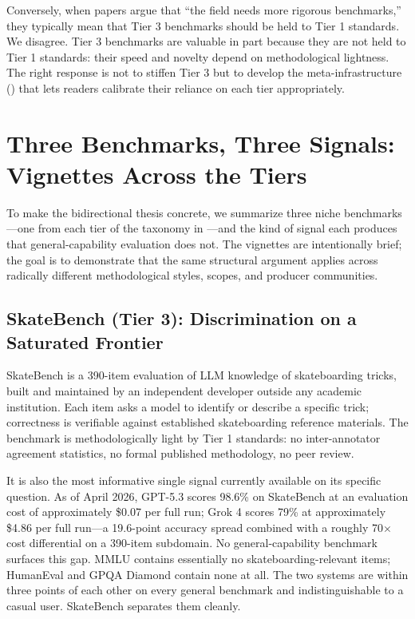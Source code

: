 \documentclass[11pt,a4paper]{article}
\begin{document}
Conversely, when papers argue that ``the field needs more rigorous benchmarks,'' they typically mean that Tier 3 benchmarks should be held to Tier 1 standards. We disagree. Tier 3 benchmarks are valuable in part because they are not held to Tier 1 standards: their speed and novelty depend on methodological lightness. The right response is not to stiffen Tier 3 but to develop the meta-infrastructure () that lets readers calibrate their reliance on each tier appropriately.

\section{Three Benchmarks, Three Signals: Vignettes Across the Tiers}
\label{sec:casestudy}

To make the bidirectional thesis concrete, we summarize three niche benchmarks---one from each tier of the taxonomy in ---and the kind of signal each produces that general-capability evaluation does not. The vignettes are intentionally brief; the goal is to demonstrate that the same structural argument applies across radically different methodological styles, scopes, and producer communities.

\subsection{SkateBench (Tier 3): Discrimination on a Saturated Frontier}
\label{sec:vignette-skate}

SkateBench \citep{browne2025skatebench} is a 390-item evaluation of LLM knowledge of skateboarding tricks, built and maintained by an independent developer outside any academic institution. Each item asks a model to identify or describe a specific trick; correctness is verifiable against established skateboarding reference materials. The benchmark is methodologically light by Tier 1 standards: no inter-annotator agreement statistics, no formal published methodology, no peer review.

It is also the most informative single signal currently available on its specific question. As of April 2026, GPT-5.3 scores 98.6\% on SkateBench at an evaluation cost of approximately \$0.07 per full run; Grok 4 scores 79\% at approximately \$4.86 per full run---a 19.6-point accuracy spread combined with a roughly 70$\times$ cost differential on a 390-item subdomain. No general-capability benchmark surfaces this gap. MMLU contains essentially no skateboarding-relevant items; HumanEval and GPQA Diamond contain none at all. The two systems are within three points of each other on every general benchmark and indistinguishable to a casual user. SkateBench separates them cleanly.
\end{document}
